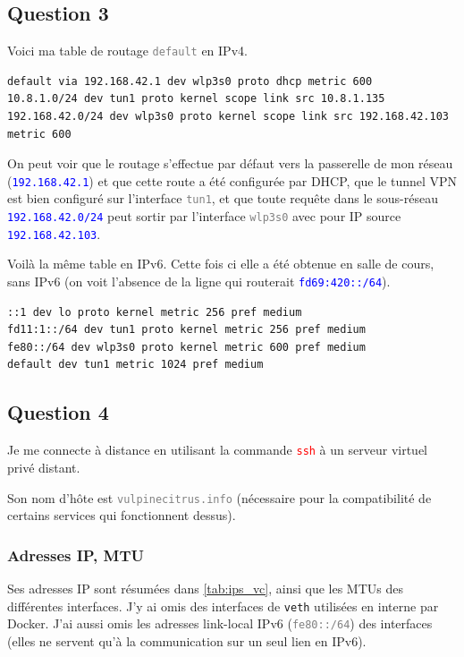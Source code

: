 \documentclass[a4paper,10pt]{article}
\newcommand{\codeword}[1]{\texttt{\textcolor{gray}{#1}}}
\newcommand{\blueword}[1]{\texttt{\textcolor{blue}{#1}}}
\newcommand{\redword}[1]{\texttt{\textcolor{red}{#1}}}
\begin{document}
\subsection{Question 3}

Voici ma table de routage \codeword{default} en IPv4.
\begin{lstlisting}
default via 192.168.42.1 dev wlp3s0 proto dhcp metric 600 
10.8.1.0/24 dev tun1 proto kernel scope link src 10.8.1.135 
192.168.42.0/24 dev wlp3s0 proto kernel scope link src 192.168.42.103 metric 600
\end{lstlisting}

On peut voir que le routage s'effectue par défaut vers la passerelle de mon réseau (\blueword{192.168.42.1}) et que cette route a été configurée par DHCP, que le tunnel VPN est bien configuré sur l'interface \codeword{tun1}, et que toute requête dans le sous-réseau \blueword{192.168.42.0/24} peut sortir par l'interface \codeword{wlp3s0} avec pour IP source \blueword{192.168.42.103}.

Voilà la même table en IPv6. Cette fois ci elle a été obtenue en salle de cours, sans IPv6 (on voit l'absence de la ligne qui routerait \blueword{fd69:420::/64}).

\begin{lstlisting}
::1 dev lo proto kernel metric 256 pref medium
fd11:1::/64 dev tun1 proto kernel metric 256 pref medium
fe80::/64 dev wlp3s0 proto kernel metric 600 pref medium
default dev tun1 metric 1024 pref medium
\end{lstlisting}

\subsection{Question 4}

Je me connecte à distance en utilisant la commande \redword{ssh} à un serveur virtuel privé distant.

Son nom d'hôte est \codeword{vulpinecitrus.info} (nécessaire pour la compatibilité de certains services qui fonctionnent dessus).

\subsubsection{Adresses IP, MTU}

Ses adresses IP sont résumées dans \autoref{tab:ips_vc}, ainsi que les MTUs des différentes interfaces. J'y ai omis des interfaces de \texttt{veth} utilisées en interne par Docker. J'ai aussi omis les adresses link-local IPv6 (\codeword{fe80::/64}) des interfaces (elles ne servent qu'à la communication sur un seul lien en IPv6).
\end{document}
